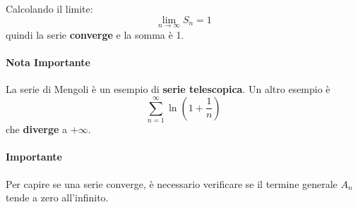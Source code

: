 \documentclass[12pt]{article}
\begin{document}
Calcolando il limite:
\[
\lim_{n \to \infty} S_n = 1
\]
quindi la serie \textbf{converge} e la somma è 1.

\paragraph{Nota Importante} La serie di Mengoli è un esempio di \textbf{serie telescopica}. Un altro esempio è
\[
\sum_{n=1}^\infty \ln \left(1 + \frac{1}{n}\right)
\]
che \textbf{diverge} a $+\infty$.

\paragraph{Importante} Per capire se una serie converge, è necessario verificare se il termine generale $A_n$ tende a zero all'infinito.
\end{document}
